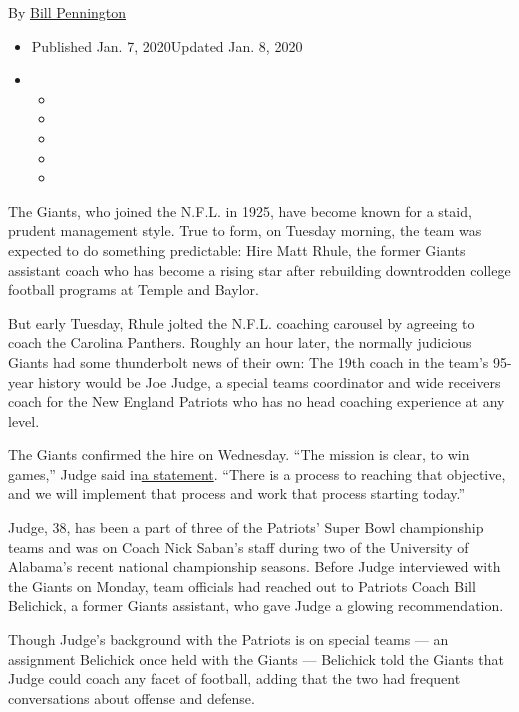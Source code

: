By \href{https://www.nytimes3xbfgragh.onion/by/bill-pennington}{Bill
Pennington}

\begin{itemize}
\item
  Published Jan. 7, 2020Updated Jan. 8, 2020
\item
  \begin{itemize}
  \item
  \item
  \item
  \item
  \item
  \end{itemize}
\end{itemize}

The Giants, who joined the N.F.L. in 1925, have become known for a
staid, prudent management style. True to form, on Tuesday morning, the
team was expected to do something predictable: Hire Matt Rhule, the
former Giants assistant coach who has become a rising star after
rebuilding downtrodden college football programs at Temple and Baylor.

But early Tuesday, Rhule jolted the N.F.L. coaching carousel by agreeing
to coach the Carolina Panthers. Roughly an hour later, the normally
judicious Giants had some thunderbolt news of their own: The 19th coach
in the team's 95-year history would be Joe Judge, a special teams
coordinator and wide receivers coach for the New England Patriots who
has no head coaching experience at any level.

The Giants confirmed the hire on Wednesday. ``The mission is clear, to
win games,'' Judge said
in\href{https://www.giants.com/news/joe-judge-hired-new-head-coach-new-england-patriots-special-teams-coordinator}{a
statement}. ``There is a process to reaching that objective, and we will
implement that process and work that process starting today.''

Judge, 38, has been a part of three of the Patriots' Super Bowl
championship teams and was on Coach Nick Saban's staff during two of the
University of Alabama's recent national championship seasons. Before
Judge interviewed with the Giants on Monday, team officials had reached
out to Patriots Coach Bill Belichick, a former Giants assistant, who
gave Judge a glowing recommendation.

Though Judge's background with the Patriots is on special teams --- an
assignment Belichick once held with the Giants --- Belichick told the
Giants that Judge could coach any facet of football, adding that the two
had frequent conversations about offense and defense.

